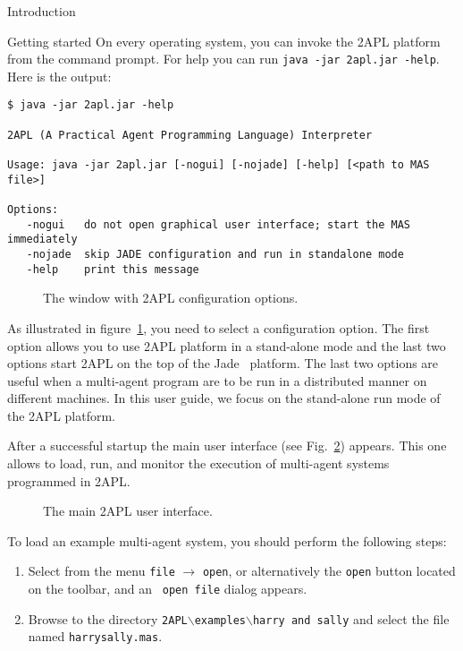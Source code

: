\begin{chapter}{Introduction}
\begin{section}{Getting started}
On every operating system, you can invoke the 2APL platform from the command prompt.
For help you can run \texttt{java -jar 2apl.jar -help}. Here is the output:
\begin{verbatim}
$ java -jar 2apl.jar -help

2APL (A Practical Agent Programming Language) Interpreter

Usage: java -jar 2apl.jar [-nogui] [-nojade] [-help] [<path to MAS file>]

Options:
   -nogui   do not open graphical user interface; start the MAS immediately
   -nojade  skip JADE configuration and run in standalone mode
   -help    print this message
\end{verbatim}

    \begin{figure}
        \begin{center}
            \caption{The window with 2APL configuration options.}\label{fig:configuration}
        \end{center}
    \end{figure}

As illustrated in figure~\ref{fig:configuration}, you need to select
a configuration option. The first option allows you to use 2APL
platform in a stand-alone mode and the last two options start 2APL
on the top of the Jade~\cite{jade2005} platform. The last two
options are useful when a multi-agent program are to be run in a
distributed manner on different machines. In this user guide, we
focus on the stand-alone run mode of the 2APL platform.

After a successful startup the main user interface (see Fig.~\ref{fig:mainscreen}) appears.
This one allows to load, run, and monitor the
execution of multi-agent systems programmed in 2APL.

    \begin{figure}
        \begin{center}
            \caption{The main 2APL user interface.}\label{fig:mainscreen}
        \end{center}
    \end{figure}

To load an example multi-agent system, you should perform the
following steps:
\begin{enumerate}
    \item Select from the menu {\tt file} $\rightarrow$ {\tt open}, or
    alternatively the {\tt open} button located on the toolbar, and an {\tt
    open file} dialog appears.
    \item Browse to the directory {\tt 2APL}$\backslash${\tt examples}$\backslash${\tt harry and sally} and
    select the file named {\tt harrysally.mas}.
\end{enumerate}


\end{section}
\end{chapter}
